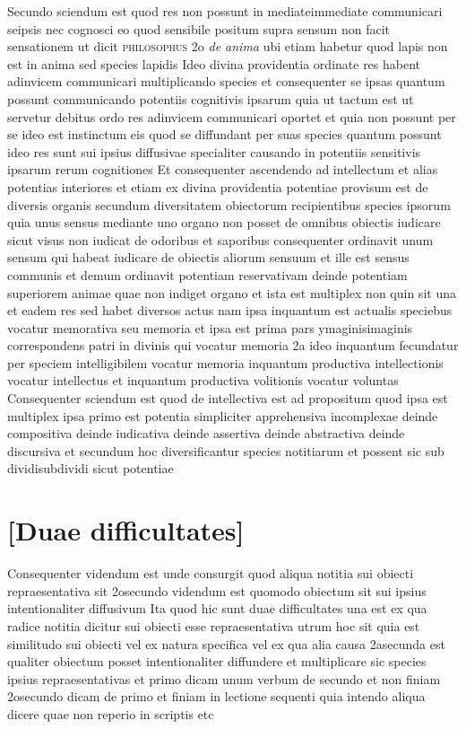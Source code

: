 \documentclass[twoside, openright]{report}
\newcommand{\name}[1]{\textsc{#1}}
\newcommand{\worktitle}[1]{\textit{#1}}
\begin{document}
        \pstart
        Secundo sciendum est quod res non possunt in mediateimmediate communicari seipsis nec cognosci eo quod sensibile positum supra sensum non facit sensationem ut dicit \name{philosophus} 2o \worktitle{de anima} ubi etiam habetur quod lapis non est in anima sed species lapidis Ideo divina providentia ordinate res habent adinvicem communicari multiplicando species et consequenter se ipsas quantum possunt communicando potentiis cognitivis ipsarum quia ut tactum est ut servetur debitus ordo res adinvicem communicari oportet  et quia non possunt per se ideo est instinctum eis quod se diffundant per suas species quantum possunt ideo res sunt sui ipsius diffusivae specialiter causando in potentiis sensitivis ipsarum rerum cognitiones  Et consequenter ascendendo ad intellectum et alias potentias interiores et etiam ex divina providentia potentiae provisum est de diversis organis secundum diversitatem obiectorum recipientibus species ipsorum quia unus sensus mediante uno organo non posset de omnibus obiectis iudicare sicut visus non iudicat de odoribus et saporibus consequenter ordinavit unum sensum qui habeat iudicare de obiectis aliorum sensuum et ille est sensus communis et demum ordinavit potentiam reservativam  deinde potentiam superiorem animae quae non indiget organo et ista est multiplex non quin sit una et eadem res sed habet diversos actus nam ipsa inquantum est actualis speciebus vocatur memorativa seu memoria  et ipsa est prima pars ymaginisimaginis correspondens patri in divinis qui vocatur memoria 2a  ideo inquantum fecundatur per speciem intelligibilem vocatur memoria inquantum productiva intellectionis vocatur intellectus et inquantum productiva volitionis vocatur voluntas Consequenter sciendum est quod de intellectiva est ad propositum quod ipsa est multiplex ipsa primo est potentia simpliciter apprehensiva incomplexae deinde compositiva  deinde iudicativa deinde assertiva deinde abstractiva deinde discursiva  et secundum hoc diversificantur species notitiarum et possent sic sub dividisubdividi sicut potentiae
        \pend
      
        \bigskip
         \section*{[Duae difficultates]} 
        \pstart
        Consequenter videndum est unde consurgit quod aliqua notitia sui obiecti repraesentativa sit  2osecundo videndum est quomodo obiectum sit sui ipsius intentionaliter diffusivum Ita quod hic sunt duae difficultates una est ex qua radice notitia dicitur sui obiecti esse repraesentativa  utrum hoc sit quia est similitudo sui obiecti vel ex natura specifica vel ex qua alia causa 2asecunda est qualiter obiectum posset intentionaliter diffundere et multiplicare sic species ipsius repraesentativas et primo dicam unum verbum de secundo et non finiam 2osecundo dicam de primo et finiam in lectione sequenti quia intendo aliqua dicere quae non reperio in scriptis etc
        \pend
      
\end{document}

